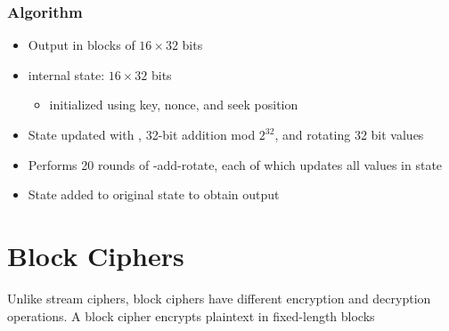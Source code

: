 \documentclass[draft]{article}
\begin{document}
\subsubsection*{Algorithm}
\begin{itemize}[nosep]
    \item Output in blocks of $16\times32$ bits
    \item internal state: $16\times 32$ bits
          \begin{itemize}[nosep]\item initialized using key, nonce, and seek position\end{itemize}
    \item State updated with , 32-bit addition mod $2^{32}$, and rotating 32 bit values
    \item Performs 20 rounds of -add-rotate, each of which updates all values in state
    \item State added to original state to obtain output
\end{itemize}
\section{Block Ciphers}
Unlike \glspl{stream cipher}, \glspl{block cipher} have different encryption and decryption operations. A block cipher encrypts plaintext in fixed-length blocks
\end{document}
